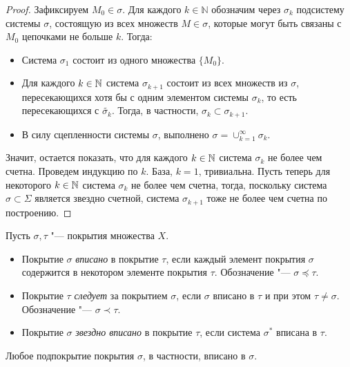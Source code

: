 \begin{proof}
    Зафиксируем $M_0 \in \sigma$. Для каждого $k \in \mathbb N$ обозначим через $\sigma_k$ подсистему системы $\sigma$, состоящую из всех множеств $M\in\sigma$, которые могут быть связаны с $M_0$ цепочками не больше $k$. Тогда:
    \begin{itemize}
        \item Система $\sigma_1$ состоит из одного множества $\{M_0\}$.
        
        \item Для каждого $k \in \mathbb{N}$ система $\sigma_{k+1}$ состоит из всех множеств из $\sigma$, пересекающихся хотя бы с одним элементом системы $\sigma_k$, то есть пересекающихся с $\widetilde{\sigma_k}$. Тогда, в частности, $\sigma_k \subset \sigma_{k+1}$.
        
        \item В силу сцепленности системы $\sigma$, выполнено $\sigma = \cup_{k=1}^{\infty}\sigma_k$.
    \end{itemize}

    Значит, остается показать, что для каждого $k \in \mathbb{N}$ система $\sigma_k$ не более чем счетна. Проведем индукцию по $k$. База, $k = 1$, тривиальна. Пусть теперь для некоторого $k \in \mathbb{N}$ система $\sigma_k$ не более чем счетна, тогда, поскольку система $\sigma \subset \Sigma$ является звездно счетной, система $\sigma_{k+1}$ тоже не более чем счетна по построению.
\end{proof}

\begin{definition}
    Пусть $\sigma, \tau$ "--- покрытия множества $X$.
    \begin{itemize}
        \item Покрытие $\sigma$ \textit{вписано} в покрытие $\tau$, если каждый элемент покрытия $\sigma$ содержится в некотором элементе покрытия $\tau$. Обозначение "--- $\sigma \preceq \tau$.

        \item Покрытие $\tau$ \textit{следует} за покрытием $\sigma$, если $\sigma$ вписано в $\tau$ и при этом $\tau \ne \sigma$. Обозначение "--- $\sigma \prec \tau$.

        \item Покрытие $\sigma$ \textit{звездно вписано} в покрытие $\tau$, если система $\sigma^*$ вписана в $\tau$.
    \end{itemize}
\end{definition}

\begin{note}
    Любое подпокрытие покрытия $\sigma$, в частности, вписано в $\sigma$.
\end{note}

